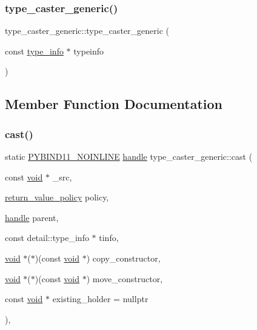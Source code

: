 \subsubsection{\texorpdfstring{type\_caster\_generic()}{type\_caster\_generic()}\hspace{0.1cm}{\footnotesize\ttfamily [2/2]}}
{\footnotesize\ttfamily type\+\_\+caster\+\_\+generic\+::type\+\_\+caster\+\_\+generic (\begin{DoxyParamCaption}\item[{const \mbox{\hyperlink{structtype__info}{type\+\_\+info}} $\ast$}]{typeinfo }\end{DoxyParamCaption})\hspace{0.3cm}{\ttfamily [inline]}}



\subsection{Member Function Documentation}
\mbox{\label{classtype__caster__generic_a7256e99988999dc3735dadaf55757b4a}} 
\subsubsection{\texorpdfstring{cast()}{cast()}}
{\footnotesize\ttfamily static \mbox{\hyperlink{detail_2common_8h_a1fb186b7494d5c576d902c0730ecbb71}{P\+Y\+B\+I\+N\+D11\+\_\+\+N\+O\+I\+N\+L\+I\+NE}} \mbox{\hyperlink{classhandle}{handle}} type\+\_\+caster\+\_\+generic\+::cast (\begin{DoxyParamCaption}\item[{const \mbox{\hyperlink{_s_d_l__opengles2__gl2ext_8h_ae5d8fa23ad07c48bb609509eae494c95}{void}} $\ast$}]{\+\_\+src,  }\item[{\mbox{\hyperlink{detail_2common_8h_adde72ab1fb0dd4b48a5232c349a53841}{return\+\_\+value\+\_\+policy}}}]{policy,  }\item[{\mbox{\hyperlink{classhandle}{handle}}}]{parent,  }\item[{const detail\+::type\+\_\+info $\ast$}]{tinfo,  }\item[{\mbox{\hyperlink{_s_d_l__opengles2__gl2ext_8h_ae5d8fa23ad07c48bb609509eae494c95}{void}} $\ast$($\ast$)(const \mbox{\hyperlink{_s_d_l__opengles2__gl2ext_8h_ae5d8fa23ad07c48bb609509eae494c95}{void}} $\ast$)}]{copy\+\_\+constructor,  }\item[{\mbox{\hyperlink{_s_d_l__opengles2__gl2ext_8h_ae5d8fa23ad07c48bb609509eae494c95}{void}} $\ast$($\ast$)(const \mbox{\hyperlink{_s_d_l__opengles2__gl2ext_8h_ae5d8fa23ad07c48bb609509eae494c95}{void}} $\ast$)}]{move\+\_\+constructor,  }\item[{const \mbox{\hyperlink{_s_d_l__opengles2__gl2ext_8h_ae5d8fa23ad07c48bb609509eae494c95}{void}} $\ast$}]{existing\+\_\+holder = {\ttfamily nullptr} }\end{DoxyParamCaption})\hspace{0.3cm}{\ttfamily [inline]}, {\ttfamily [static]}}

